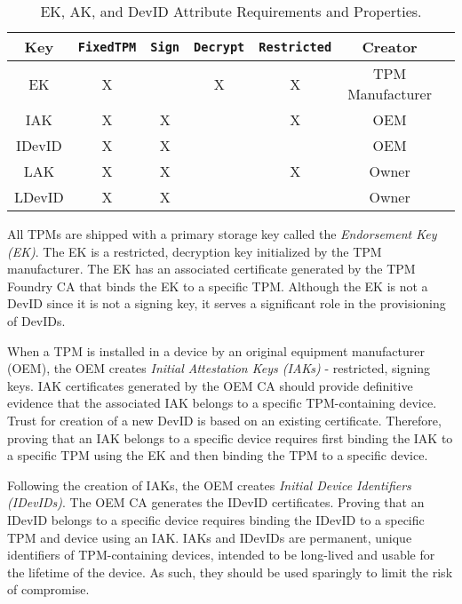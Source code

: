 \documentclass[runningheads]{llncs}
\begin{document}
\begin{table}[hbtp]
  \begin{center}
    \footnotesize
    \begin{tabular}{ |c|c|c|c|c|c|c| }
      \hline
Key & \verb|FixedTPM| & \verb|Sign| & \verb|Decrypt| & \verb|Restricted| &
Creator \\
      \hline
      \hline
      EK & X &   & X & X & TPM Manufacturer \\
      \hline
      IAK & X & X &   & X & OEM   \\
      \hline
      IDevID & X & X &   &   & OEM   \\
      \hline
      LAK & X & X &   & X & Owner  \\
      \hline
      LDevID & X & X &   &   & Owner  \\
      \hline
    \end{tabular}
    \caption{EK, AK, and DevID Attribute Requirements and Properties.}
    \label{fig:req_and_recs}
  \end{center}
\end{table}

All TPMs are shipped with a primary storage key called the \emph{Endorsement
Key (EK)}.  The EK is a restricted, decryption key initialized
by the TPM manufacturer.  The EK has an associated certificate generated 
by the TPM Foundry CA that binds the EK to a specific TPM. Although 
the EK is not a DevID since it is not a signing key,
it serves a significant role in the provisioning of DevIDs.



When a TPM is installed in a device by an original equipment manufacturer (OEM), 
the OEM creates \emph{Initial Attestation Keys (IAKs)} - restricted, signing 
keys. IAK certificates generated by the OEM CA 
should provide definitive evidence that the associated IAK belongs to a specific 
TPM-containing device. 
Trust for creation of a new DevID is based on an existing certificate.
Therefore, proving that an IAK belongs to a specific device requires first
binding the IAK to a specific TPM using the EK and then binding the TPM to a 
specific device.


Following the creation of IAKs, the OEM creates
\emph{Initial Device Identifiers (IDevIDs)}. The OEM CA generates the IDevID certificates.
Proving that an IDevID belongs to a specific device requires binding the IDevID
to a specific TPM and device using an IAK.
IAKs and IDevIDs are permanent, unique identifiers of TPM-containing 
devices, intended to be long-lived and usable for the lifetime of the device. 
As such, they should be used sparingly to limit the risk of compromise.
\end{document}
